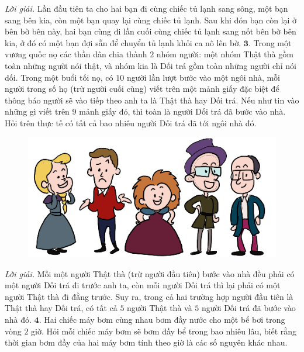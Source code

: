 \begin{multicols}{2}
\begin{figure}[H]
		\vspace*{-15pt}
	\end{figure}
	\textit{Lời giải.} Lần đầu tiên ta cho hai bạn đi cùng chiếc tủ lạnh sang sông, một bạn sang bên kia, còn một bạn quay lại cùng chiếc tủ lạnh. Sau khi đón bạn còn lại ở bên bờ bên này, hai bạn cùng đi lần cuối cùng chiếc tủ lạnh sang nốt bên bờ bên kia, ở đó có một bạn đợi sẵn để chuyển tủ lạnh khỏi ca nô lên bờ.
	\vskip 0.1cm
	$\pmb{3.}$ Trong một vương quốc nọ các thần dân chia thành $2$ nhóm người: một nhóm Thật thà gồm toàn những người nói thật, và nhóm kia là Dối trá gồm toàn những người chỉ nói dối. Trong một buổi tối nọ, có $10$ người lần lượt bước vào một ngôi nhà, mỗi người trong số họ (trừ người cuối cùng) viết trên một mảnh giấy đặc biệt để thông báo người sẽ vào tiếp theo anh ta là Thật thà hay Dối trá. Nếu như tin vào những gì viết trên $9$ mảnh giấy đó, thì toàn là người Dối trá đã bước vào nhà. Hỏi trên thực tế có tất cả bao nhiêu người Dối trá đã tới ngôi nhà đó.	
	\begin{figure}[H]
		\vspace*{-5pt}
		\centering
		\captionsetup{labelformat= empty, justification=centering}
		\includegraphics[width= 1\linewidth]{b3}
		\vspace*{-15pt}
	\end{figure}
	\textit{Lời giải.} Mỗi một người Thật thà (trừ người đầu tiên) bước vào nhà đều phải có một người Dối trá đi trước anh ta, còn mỗi người Dối trá thì lại phải có một người Thật thà đi đằng trước. Suy ra, trong cả hai trường hợp người đầu tiên là Thật thà hay Dối trá, có tất cả $5$ người Thật thà và $5$ người Dối trá đã bước vào nhà đó.
	\vskip 0.1cm
	$\pmb{4.}$ Hai chiếc máy bơm cùng nhau bơm đầy nước cho một bể bơi trong vòng $2$ giờ. Hỏi mỗi chiếc máy bơm sẽ bơm đầy bể trong bao nhiêu lâu, biết rằng thời gian bơm đầy của hai máy bơm tính theo giờ là các số nguyên khác nhau.
	\begin{figure}[H]

\end{figure}
\end{multicols}
